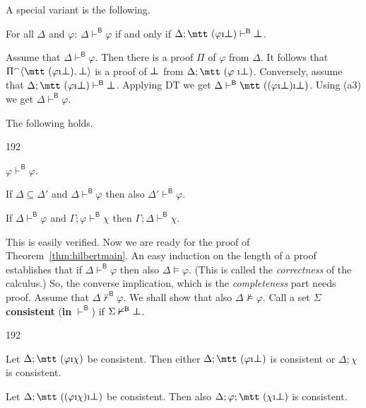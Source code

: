 A special variant is the following.
\begin{lem}
For all $\Delta$ and $\varphi$: $\Delta\vdash^{\mathsf{B}}\varphi$ 
if and only if $\Delta;\mbox{\mtt ($\varphi$\symbol{25}$\sbot$)}%
\vdash^{\mathsf{B}}\sbot$.
\end{lem}
\proofbeg 
Assume that $\Delta\vdash^{\mathsf{B}}\varphi$. Then
there is a proof $\Pi$ of $\varphi$ from $\Delta$. It follows that 
$\Pi^{\smallfrown}\auf \mbox{\mtt ($\varphi$\symbol{25}$\sbot$)},
\sbot\zu$ is a proof of $\boldsymbol{\bot}$ from $\Delta;\mbox{\mtt ($\varphi$
\symbol{25}$\sbot$)}$. Conversely, assume that
$\Delta;\mbox{\mtt ($\varphi$\symbol{25}$\sbot$)} \vdash^{\mathsf{B}}
\sbot$. Applying DT we get $\Delta\vdash^{\mathsf{B}}\mbox{\mtt
(($\varphi$\symbol{25}$\sbot$)\symbol{25}$\sbot$)}$. Using (a3) we
get $\Delta\vdash^{\mathsf{B}}\varphi$. 
\proofend
\begin{prop}
\label{prop:deduce}
The following holds.
\begin{dingautolist}{192}
\item $\varphi \vdash^{\mathsf{B}} \varphi$.
\item If $\Delta \subseteq  \Delta'$ and
    $\Delta \vdash^{\mathsf{B}}\varphi$
    then also $\Delta' \vdash^{\mathsf{B}} \varphi$.
\item If $\Delta \vdash^{\mathsf{B}} \varphi$ and
    $\Gamma; \varphi \vdash^{\mathsf{B}} \chi$
    then $\Gamma;\Delta \vdash^{\mathsf{B}} \chi$.
\end{dingautolist}
\end{prop}
This is easily verified. Now we are ready for the proof of
Theorem~\ref{thm:hilbertmain}. An easy induction on the length of
a proof establishes that if $\Delta \vdash^{\mathsf{B}} \varphi$
then also $\Delta \vDash \varphi$. (This is called the {\it
correctness\/} of the calculus.) So, the converse implication,
which is the {\it completeness\/} part needs proof. Assume that
$\Delta \nvdash^{\mathsf{B}} \varphi$. We shall show that also
$\Delta \nvDash \varphi$. Call a set $\Sigma$ \textbf{consistent} 
(\textbf{in} $\vdash^{\mathsf{B}}$)  if
$\Sigma \nvdash^{\mathsf{B}} \boldsymbol{\bot}$.
\begin{lem}
\label{lem:tableau}
\begin{dingautolist}{192}
\item
Let $\Delta;\mbox{\mtt ($\varphi$\symbol{25}$\chi$)}$ be consistent.
Then either $\Delta;\mbox{\mtt ($\varphi$\symbol{25}$\sbot$)}$ is
consistent or $\Delta;\chi$ is consistent.
\item
Let $\Delta;\mbox{\mtt (($\varphi$\symbol{25}$\chi$)\symbol{25}%
$\sbot$)}$ be consistent. Then also $\Delta;\varphi;\mbox{\mtt 
($\chi$\symbol{25}$\sbot$)}$ is consistent.
\end{dingautolist}
\end{lem}
